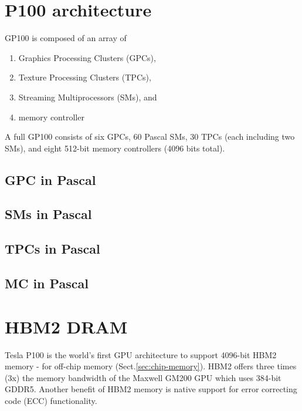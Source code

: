 \section{P100 architecture}


GP100 is composed of an array of 
\begin{enumerate}
  \item  Graphics Processing Clusters (GPCs), 
  
  \item Texture Processing Clusters (TPCs), 
  
  \item Streaming Multiprocessors (SMs), and 
  
  \item memory controller

\end{enumerate}

A full GP100 consists of six GPCs, 60 Pascal SMs, 30 TPCs (each including two
SMs), and eight 512-bit memory controllers (4096 bits total).

\subsection{GPC in Pascal}

\subsection{SMs in Pascal}

\subsection{TPCs in Pascal}

\subsection{MC in Pascal}




\section{HBM2 DRAM}
\label{sec:HBM2-RAM}



Tesla P100 is the world’s first GPU architecture to support 4096-bit HBM2 memory
- for off-chip memory (Sect.\ref{sec:chip-memory}). HBM2 offers three times (3x)
the memory bandwidth of the Maxwell GM200 GPU which uses 384-bit GDDR5.
Another benefit of HBM2 memory is native support for error correcting code (ECC)
functionality. 

